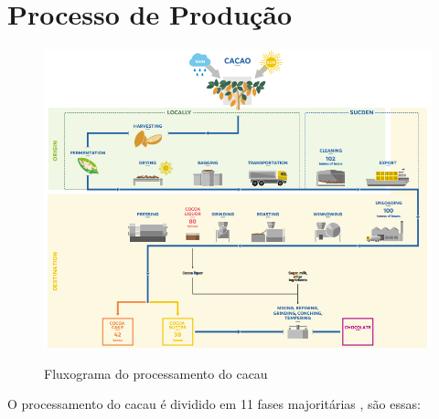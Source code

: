 \documentclass[
	12pt,				%
	openright,			%
	oneside,			%
	a4paper,			%
	english,			%
	french,				%
	spanish,			%
	brazil				%
	]{abntex2}
\begin{document}
\newpage
\chapter{Processo de Produção}

\begin{figure}[H]
\begin{center}
\caption{Fluxograma do processamento do cacau}
\includegraphics[scale=0.59]{../../Pictures/cacaoprocess.png} 
\label{fig1}
\end{center}
\end{figure}

O processamento do cacau é dividido em 11 fases majoritárias \cite{3}, são essas:
\end{document}
